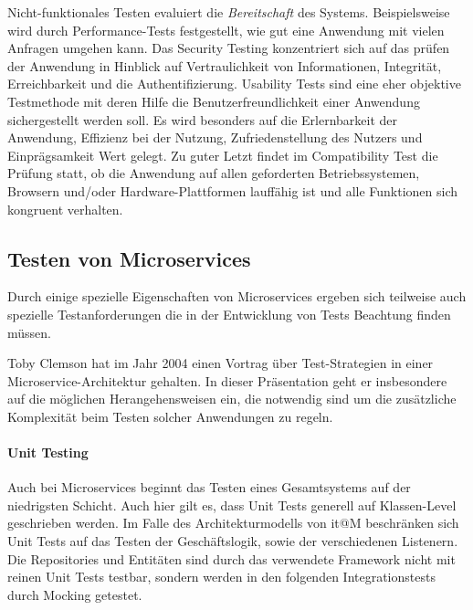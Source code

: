 \documentclass[12pt,a4paper,bibliography=totocnumbered,listof=totocnumbered]{scrartcl}
\begin{document}

Nicht-funktionales Testen evaluiert die \textit{Bereitschaft} des Systems.\cite{erikssontesting} Beispielsweise wird durch Performance-Tests festgestellt, wie gut eine Anwendung mit vielen Anfragen umgehen kann.\cite{inflectra}
Das Security Testing konzentriert sich auf das prüfen der Anwendung in Hinblick auf Vertraulichkeit von Informationen, Integrität, Erreichbarkeit und die Authentifizierung.\cite{inflectra}
Usability Tests sind eine eher objektive Testmethode mit deren Hilfe die Benutzerfreundlichkeit einer Anwendung sichergestellt werden soll. Es wird besonders auf die Erlernbarkeit der Anwendung, Effizienz bei der Nutzung, Zufriedenstellung des Nutzers und Einprägsamkeit Wert gelegt.
Zu guter Letzt findet im Compatibility Test die Prüfung statt, ob die Anwendung auf allen geforderten Betriebssystemen, Browsern und/oder Hardware-Plattformen lauffähig ist und alle Funktionen sich kongruent verhalten.

\subsection{Testen von Microservices}\label{ch:ms-test}
\label{sec:testingms}

Durch einige spezielle Eigenschaften von Microservices ergeben sich teilweise auch spezielle Testanforderungen die in der Entwicklung von Tests Beachtung finden müssen. 


Toby Clemson hat im Jahr 2004 einen Vortrag über Test-Strategien in einer Microservice-Architektur gehalten.\cite{clemson} In dieser Präsentation geht er insbesondere auf die möglichen Herangehensweisen ein, die notwendig sind um die zusätzliche Komplexität beim Testen solcher Anwendungen zu regeln.

\paragraph{Unit Testing}

Auch bei Microservices beginnt das Testen eines Gesamtsystems auf der niedrigsten Schicht. Auch hier gilt es, dass Unit Tests generell auf Klassen-Level geschrieben werden.\cite{clemson} Im Falle des Architekturmodells von it@M beschränken sich Unit Tests auf das Testen der Geschäftslogik, sowie der verschiedenen Listenern. Die Repositories und Entitäten sind durch das verwendete Framework nicht mit reinen Unit Tests testbar, sondern werden in den folgenden Integrationstests durch Mocking getestet.
\end{document}
